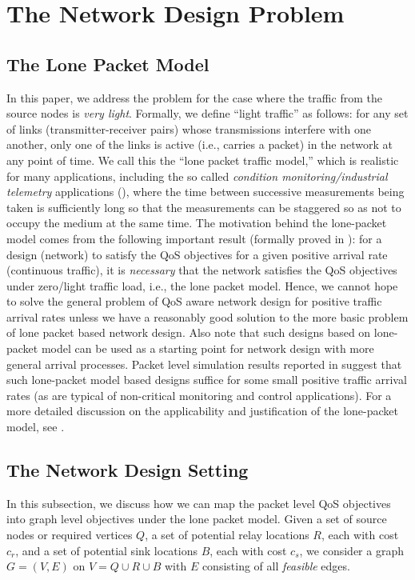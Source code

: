 \documentclass[conference]{IEEEtran}
\begin{document}
\section{The Network Design Problem}
\label{sec:formulation}

\subsection{The Lone Packet Model}
In this paper, we address the problem for the case where the traffic from the source nodes is \emph{very light}. Formally, we define ``light traffic'' as follows: for any set of links (transmitter-receiver pairs) whose transmissions interfere with one another, only one of the links is active (i.e., carries a packet) in the network at any point of time. We call this the ``lone packet traffic model,'' which is realistic for many applications, including the so called \emph{condition monitoring/industrial telemetry} applications (\cite{telemetry1,telemetry2}), where the time between successive measurements being taken is sufficiently long so that the measurements can be staggered so as not to occupy the medium at the same time. The motivation behind the lone-packet model comes from the following important result (formally proved in \cite{fullpaper}): for a design (network) to satisfy the QoS objectives for a given positive arrival rate (continuous traffic), it is \emph{necessary} that the network satisfies the QoS objectives under zero/light traffic load, i.e., the lone packet model. Hence, we cannot hope to solve the general problem of QoS aware network design for positive traffic arrival rates unless we have a reasonably good solution to the more basic problem of lone packet based network design. Also note that such designs based on lone-packet model can be used as a starting point for network design with more general arrival processes. Packet level simulation results reported in \cite{fullpaper} suggest that such lone-packet model based designs suffice for some small positive traffic arrival rates (as are typical of non-critical monitoring and control applications). For a more detailed discussion on the applicability and justification of the lone-packet model, see \cite{fullpaper}. 
 
\subsection{The Network Design Setting}
\label{subsec:network-setting}
In this subsection, we discuss how we can map the packet level QoS objectives into graph level objectives under the lone packet model. Given a set of source nodes or required vertices $Q$, a set of potential relay locations $R$, each with cost $c_r$, and a set of potential sink locations $B$, each with cost $c_s$, we consider a graph $G= (V, E)$ on $V= Q\cup R\cup B$ with $E$ consisting of all \emph{feasible} edges. 
\end{document}
